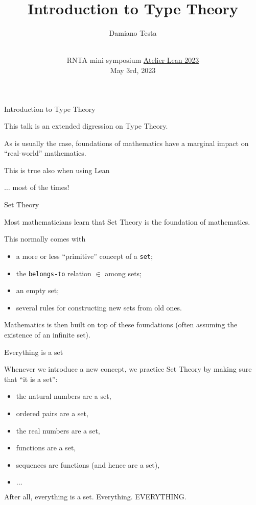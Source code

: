 \documentclass{beamer}
\title{Introduction to Type Theory}
\author{Damiano Testa}
\institute[]{University of Warwick}
\date[\href{http://www.rnta.eu/7MSRNTA/lean.html}{Atelier Lean 2023}]{\\
\vspace{50pt}
RNTA mini symposium
\href{http://www.rnta.eu/7MSRNTA/lean.html}{Atelier Lean 2023}\\
\vspace{20pt}
May 3rd, 2023
}
\begin{document}
\frame{\titlepage}

\begin{frame}[fragile]
{Introduction to Type Theory}

This talk is an extended digression on Type Theory.
\bigskip

As is usually the case, foundations of mathematics have a marginal impact on ``real-world'' mathematics.
\bigskip

This is true also when using Lean
\bigskip

$\ldots$ most of the times!
\end{frame}

\begin{frame}[fragile]{Set Theory}

Most mathematicians learn that Set Theory is the foundation of mathematics.

This normally comes with
\bigskip

\begin{itemize}
\item
  a more or less ``primitive'' concept of a {\color{violet}\verb`set`};
\item
  the {\color{violet}\verb`belongs-to`} relation $\in$ among sets;
\item
  an empty set;
\item
  several rules for constructing new sets from old ones.
\end{itemize}
\bigskip

Mathematics is then built on top of these foundations (often assuming the existence of an infinite set).
\end{frame}

\begin{frame}[fragile]{Everything is a set}

Whenever we introduce a new concept, we practice Set Theory by making sure that ``it is a set'':

\begin{itemize}
\item
  the natural numbers are a set,
\item
  ordered pairs are a set,
\item
  the real numbers are a set,
\item
  functions are a set,
\item
  sequences are functions (and hence are a set),
\item
  $\ldots$
\end{itemize}
\bigskip

After all, everything is a set. Everything. EVERYTHING.
\bigskip
\end{frame}
\end{document}
